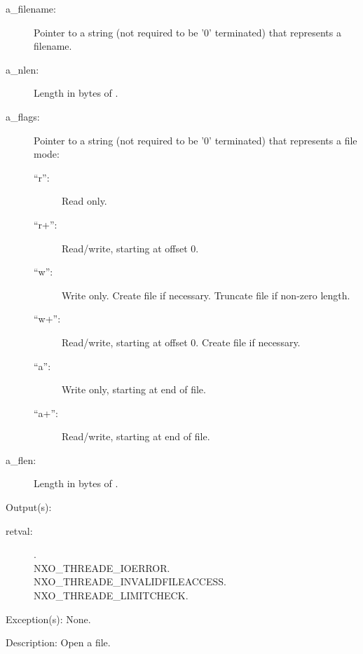 \begin{capi}
\begin{capilist}
\begin{description}
		\item[a\_filename: ]
			Pointer to a string (not required to be '{\bs}0'
			terminated) that represents a filename.
		\item[a\_nlen: ]
			Length in bytes of .
		\item[a\_flags: ]
			Pointer to a string (not required to be '{\bs}0'
			terminated) that represents a file mode:
			\begin{description}\item[]
			\item[``r'': ]
				Read only.
			\item[``r+'': ]
				Read/write, starting at offset 0.
			\item[``w'': ]
				Write only.  Create file if necessary.  Truncate
				file if non-zero length.
			\item[``w+'': ]
				Read/write, starting at offset 0.  Create
				file if necessary.
			\item[``a'': ]
				Write only, starting at end of file.
			\item[``a+'': ]
				Read/write, starting at end of file.
			\end{description}
		\item[a\_flen: ]
			Length in bytes of .
		\end{description}
	\item[Output(s): ]
		\begin{description}\item[]
		\item[retval: ]
			\begin{description}\item[]
			\item[.]
			\item[
				{NXO_THREADE_IOERROR}.]
			\item[
				{NXO_THREADE_INVALIDFILEACCESS}.]
			\item[
				{NXO_THREADE_LIMITCHECK}.]
			\end{description}
		\end{description}
	\item[Exception(s): ] None.
	\item[Description: ]
		Open a file.
	\end{capilist}
\label{nxo_file_close}

\end{capi}
